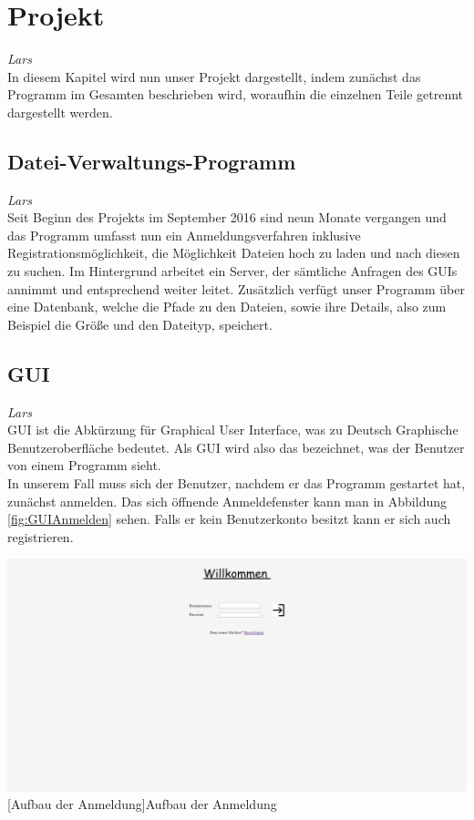 \documentclass[12pt,a4paper,bibliography=totocnumbered,listof=totocnumbered]{scrartcl}
\begin{document}
\pagebreak

\section{Projekt}
\label{sec:Projekt}
\emph{Lars}\\
In diesem Kapitel wird nun unser Projekt dargestellt, indem zunächst das Programm im Gesamten beschrieben wird, woraufhin die einzelnen Teile getrennt dargestellt werden.

\subsection{Datei-Verwaltungs-Programm}
\emph{Lars}\\
Seit Beginn des Projekts im September 2016 sind neun Monate vergangen und das Programm umfasst nun ein Anmeldungsverfahren inklusive Registrationsmöglichkeit, die Möglichkeit Dateien hoch zu laden und nach diesen zu suchen. Im Hintergrund arbeitet ein Server, der sämtliche Anfragen des GUIs annimmt und entsprechend weiter leitet. Zusätzlich verfügt unser Programm über eine Datenbank, welche die Pfade zu den Dateien, sowie ihre Details, also zum Beispiel die Größe und den Dateityp, speichert.

\subsection{GUI}
\label{GUI}
\emph{Lars}\\
GUI ist die Abkürzung für \glqq Graphical User Interface\grqq , was zu Deutsch \glqq Graphische Benutzeroberfläche\grqq{} bedeutet. Als GUI wird also das bezeichnet, was der Benutzer von einem Programm sieht. \\
In unserem Fall muss sich der Benutzer, nachdem er das Programm gestartet hat, zunächst anmelden. Das sich öffnende Anmeldefenster kann man in Abbildung \ref{fig:GUIAnmelden} sehen. Falls er kein Benutzerkonto besitzt kann er sich auch registrieren. \\

\vspace{1em}
\begin{minipage}{\linewidth}
	\centering
	\includegraphics[width=0.7\linewidth]{Bilder/GUIAnmelden.png}
	[Aufbau der Anmeldung]{Aufbau der Anmeldung}
	\label{fig:GUIAnmelden}
\end{minipage}
\end{document}
